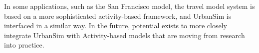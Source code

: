 In some applications, such as the San Francisco model, the travel model system is based on a more sophisticated activity-based
framework, and UrbanSim is interfaced in a similar way. In the future, potential exists to more closely integrate UrbanSim with
Activity-based models that are moving from research into practice.



